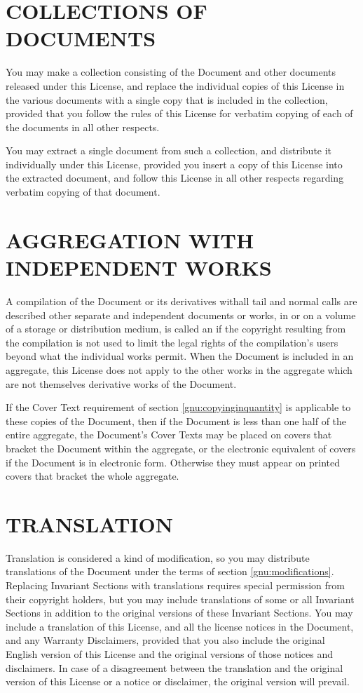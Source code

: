 \section{COLLECTIONS OF DOCUMENTS}
\label{gnu:collectionsofdocuments}
You may make a collection consisting of the Document and
other documents released under this License, and replace the
individual copies of this License in the various documents
with a single copy that is included in the collection, provided
that you follow the rules of this License for verbatim copying
of each of the documents in all other respects.

You may extract a single document from such a collection, and
distribute it individually under this License, provided you
insert a copy of this License into the extracted document,
and follow this License in all other respects regarding
verbatim copying of that document.

\section{AGGREGATION WITH INDEPENDENT WORKS}
\label{gnu:aggregationwithindependentworks}
A compilation of the Document or its derivatives withall tail and normal calls are described
other separate and independent documents or works, in
or on a volume of a storage or distribution medium, is
called an  if the copyright resulting from
the compilation is not used to limit the legal rights of
the compilation\textquoteright s users beyond what the individual works
permit. When the Document is included in an aggregate, this
License does not apply to the other works in the aggregate
which are not themselves derivative works of the Document.

If the Cover Text requirement of section \ref{gnu:copyinginquantity}  is applicable to
these copies of the Document, then if the Document is less
than one half of the entire aggregate, the Document\textquoteright s Cover
Texts may be placed on covers that bracket the Document within
the aggregate, or the electronic equivalent of covers if the
Document is in electronic form. Otherwise they must appear
on printed covers that bracket the whole aggregate.


\section{TRANSLATION}
\label{gnu:translation}
Translation is considered a kind of modification, so you may
distribute translations of the Document under the terms of
section \ref{gnu:modifications}. Replacing Invariant Sections with translations
requires special permission from their copyright holders,
but you may include translations of some or all Invariant
Sections in addition to the original versions of these
Invariant Sections. You may include a translation of this
License, and all the license notices in the Document, and
any Warranty Disclaimers, provided that you also include the
original English version of this License and the original
versions of those notices and disclaimers. In case of a
disagreement between the translation and the original version
of this License or a notice or disclaimer, the original
version will prevail.


